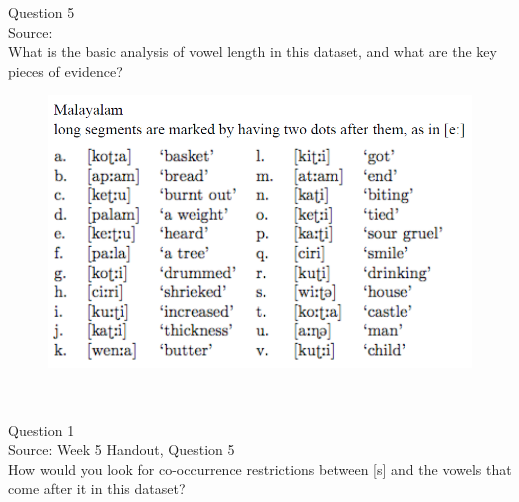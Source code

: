 \documentclass[12pt]{article}
\begin{document}
\newpage

{\large Question 5}\\

Source: \\

What is the basic analysis of vowel length in this dataset, and what are the key pieces of evidence?\\

\begin{figure}[H]
\includegraphics{../images/malayalam.png}
\end{figure}

\newpage

\begin{center}
\textbf{{\color{red}{\HUGE END OF EXAM}}}\\

\end{center}
\newpage

\begin{center}
\textbf{{\color{blue}{\HUGE START OF EXAM\\}}}

\textbf{{\color{blue}{\HUGE Student ID: 99999\\}}}

\textbf{{\color{blue}{\HUGE \\}}}

\end{center}
\newpage

{\large Question 1}\\

Source: Week 5 Handout, Question 5\\

How would you look for co-occurrence restrictions between [s] and the vowels that come after it in this dataset?\\
\end{document}
